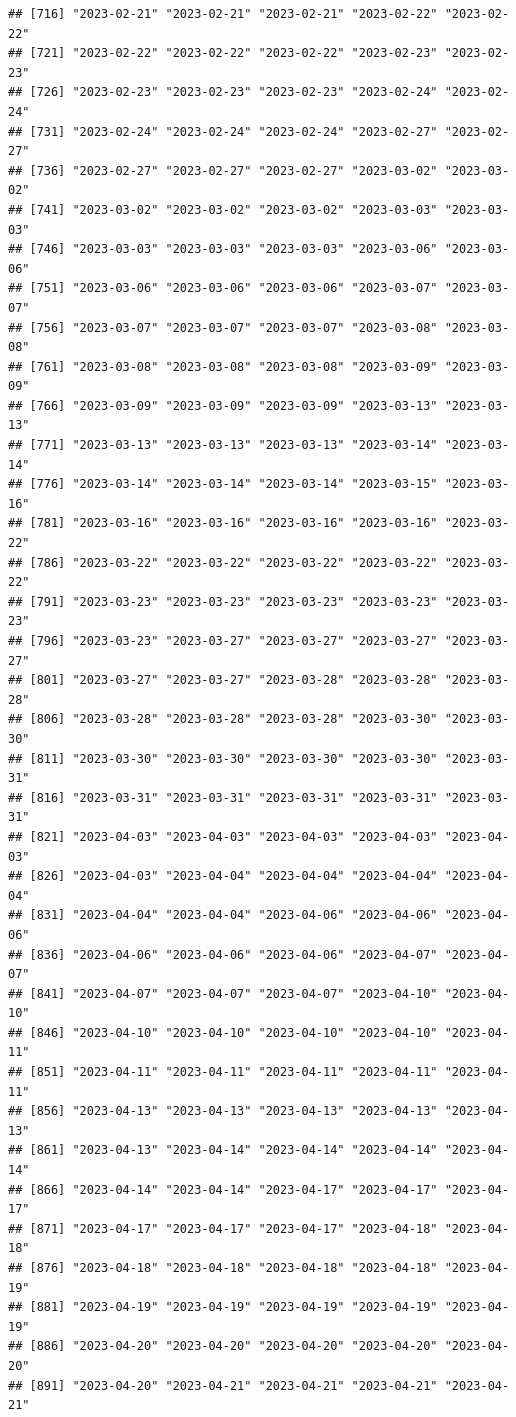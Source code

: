 \documentclass[
]{article}
\begin{document}
\begin{verbatim}
## [716] "2023-02-21" "2023-02-21" "2023-02-21" "2023-02-22" "2023-02-22"
## [721] "2023-02-22" "2023-02-22" "2023-02-22" "2023-02-23" "2023-02-23"
## [726] "2023-02-23" "2023-02-23" "2023-02-23" "2023-02-24" "2023-02-24"
## [731] "2023-02-24" "2023-02-24" "2023-02-24" "2023-02-27" "2023-02-27"
## [736] "2023-02-27" "2023-02-27" "2023-02-27" "2023-03-02" "2023-03-02"
## [741] "2023-03-02" "2023-03-02" "2023-03-02" "2023-03-03" "2023-03-03"
## [746] "2023-03-03" "2023-03-03" "2023-03-03" "2023-03-06" "2023-03-06"
## [751] "2023-03-06" "2023-03-06" "2023-03-06" "2023-03-07" "2023-03-07"
## [756] "2023-03-07" "2023-03-07" "2023-03-07" "2023-03-08" "2023-03-08"
## [761] "2023-03-08" "2023-03-08" "2023-03-08" "2023-03-09" "2023-03-09"
## [766] "2023-03-09" "2023-03-09" "2023-03-09" "2023-03-13" "2023-03-13"
## [771] "2023-03-13" "2023-03-13" "2023-03-13" "2023-03-14" "2023-03-14"
## [776] "2023-03-14" "2023-03-14" "2023-03-14" "2023-03-15" "2023-03-16"
## [781] "2023-03-16" "2023-03-16" "2023-03-16" "2023-03-16" "2023-03-22"
## [786] "2023-03-22" "2023-03-22" "2023-03-22" "2023-03-22" "2023-03-22"
## [791] "2023-03-23" "2023-03-23" "2023-03-23" "2023-03-23" "2023-03-23"
## [796] "2023-03-23" "2023-03-27" "2023-03-27" "2023-03-27" "2023-03-27"
## [801] "2023-03-27" "2023-03-27" "2023-03-28" "2023-03-28" "2023-03-28"
## [806] "2023-03-28" "2023-03-28" "2023-03-28" "2023-03-30" "2023-03-30"
## [811] "2023-03-30" "2023-03-30" "2023-03-30" "2023-03-30" "2023-03-31"
## [816] "2023-03-31" "2023-03-31" "2023-03-31" "2023-03-31" "2023-03-31"
## [821] "2023-04-03" "2023-04-03" "2023-04-03" "2023-04-03" "2023-04-03"
## [826] "2023-04-03" "2023-04-04" "2023-04-04" "2023-04-04" "2023-04-04"
## [831] "2023-04-04" "2023-04-04" "2023-04-06" "2023-04-06" "2023-04-06"
## [836] "2023-04-06" "2023-04-06" "2023-04-06" "2023-04-07" "2023-04-07"
## [841] "2023-04-07" "2023-04-07" "2023-04-07" "2023-04-10" "2023-04-10"
## [846] "2023-04-10" "2023-04-10" "2023-04-10" "2023-04-10" "2023-04-11"
## [851] "2023-04-11" "2023-04-11" "2023-04-11" "2023-04-11" "2023-04-11"
## [856] "2023-04-13" "2023-04-13" "2023-04-13" "2023-04-13" "2023-04-13"
## [861] "2023-04-13" "2023-04-14" "2023-04-14" "2023-04-14" "2023-04-14"
## [866] "2023-04-14" "2023-04-14" "2023-04-17" "2023-04-17" "2023-04-17"
## [871] "2023-04-17" "2023-04-17" "2023-04-17" "2023-04-18" "2023-04-18"
## [876] "2023-04-18" "2023-04-18" "2023-04-18" "2023-04-18" "2023-04-19"
## [881] "2023-04-19" "2023-04-19" "2023-04-19" "2023-04-19" "2023-04-19"
## [886] "2023-04-20" "2023-04-20" "2023-04-20" "2023-04-20" "2023-04-20"
## [891] "2023-04-20" "2023-04-21" "2023-04-21" "2023-04-21" "2023-04-21"

\end{verbatim}
\end{document}
